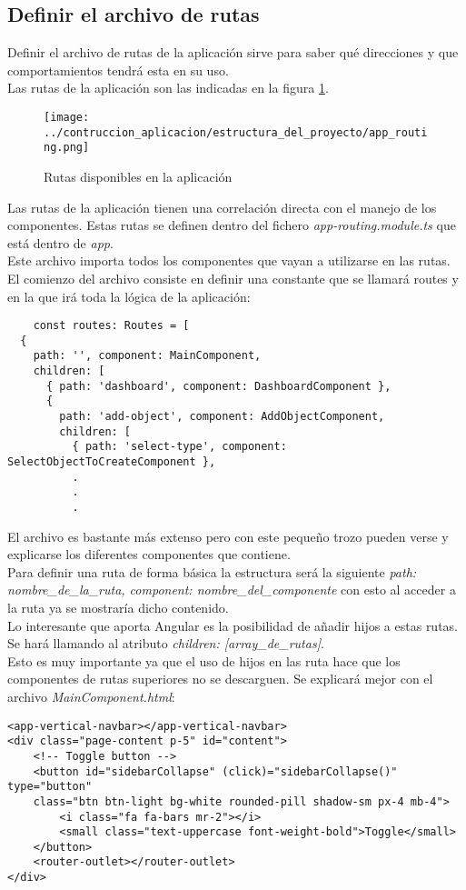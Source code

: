 \subsection{Definir el archivo de rutas}
Definir el archivo de rutas de la aplicación sirve para saber qué direcciones y que comportamientos tendrá esta en su uso.
\\Las rutas de la aplicación son las indicadas en la figura \ref{rutas_aplicacion}.

\begin{figure}[ht]
    \centering
    \texttt{[image: ../contruccion\_aplicacion/estructura\_del\_proyecto/app\_routing.png]}
    \caption{Rutas disponibles en la aplicación}\label{rutas_aplicacion}
\end{figure}

Las rutas de la aplicación tienen una correlación directa con el manejo de los componentes. Estas rutas se definen dentro del fichero \textit{app-routing.module.ts} que está dentro de \textit{app}.
\\Este archivo importa todos los componentes que vayan a utilizarse en las rutas. El comienzo del archivo consiste en definir una constante que se llamará routes y en la que irá toda la lógica de la aplicación:
\begin{verbatim}
    const routes: Routes = [
  {
    path: '', component: MainComponent,
    children: [
      { path: 'dashboard', component: DashboardComponent },
      {
        path: 'add-object', component: AddObjectComponent,
        children: [
          { path: 'select-type', component: SelectObjectToCreateComponent },
          .
          .
          .
\end{verbatim}
El archivo es bastante más extenso pero con este pequeño trozo pueden verse y explicarse los diferentes componentes que contiene.
\\Para definir una ruta de forma básica la estructura será la siguiente \textit{path: nombre\_de\_la\_ruta, component: nombre\_del\_componente} con esto al acceder a la ruta ya se mostraría dicho contenido.
\\Lo interesante que aporta Angular es la posibilidad de añadir hijos a estas rutas. Se hará llamando al atributo \textit{children: [array\_de\_rutas]}.
\\Esto es muy importante ya que el uso de hijos en las ruta hace que los componentes de rutas superiores no se descarguen. Se explicará mejor con el archivo \textit{MainComponent.html}:
\begin{verbatim}
<app-vertical-navbar></app-vertical-navbar>
<div class="page-content p-5" id="content">
    <!-- Toggle button -->
    <button id="sidebarCollapse" (click)="sidebarCollapse()" type="button"
    class="btn btn-light bg-white rounded-pill shadow-sm px-4 mb-4">
        <i class="fa fa-bars mr-2"></i>
        <small class="text-uppercase font-weight-bold">Toggle</small>
    </button>
    <router-outlet></router-outlet>
</div>
\end{verbatim}
